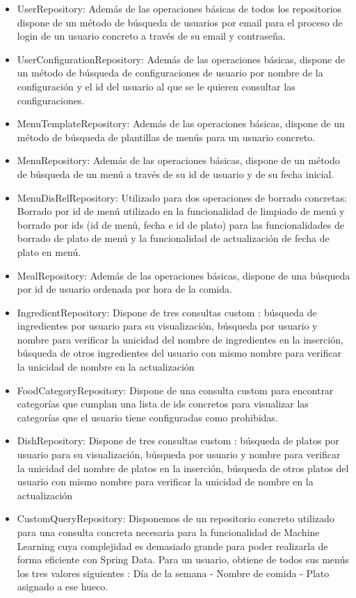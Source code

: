 \documentclass[12pt, a4paper, twoside]{book}
\begin{document}
	\begin{itemize}
		\item UserRepository: Además de las operaciones básicas de todos los repositorios dispone de un método de búsqueda de usuarios por email para el proceso de login de un usuario concreto a través de su email y contraseña.
		\item UserConfigurationRepository: Además de las operaciones básicas, dispone de un método de búsqueda de configuraciones de usuario por nombre de la configuración y el id del usuario al que se le quieren consultar las configuraciones.
		\item MenuTemplateRepository: Además de las operaciones básicas, dispone de un método de búsqueda de plantillas de menús para un usuario concreto.
		\item MenuRepository: Además de las operaciones básicas, dispone de un método de búsqueda de un menú a través de su id de usuario y de su fecha inicial.
		\item MenuDisRelRepository: Utilizado para dos operaciones de borrado concretas: Borrado por id de menú utilizado en la funcionalidad de limpiado de menú y borrado por ids (id de menú, fecha e id de plato) para las funcionalidades de borrado de plato de menú y la funcionalidad de actualización de fecha de plato en menú.
		\item MealRepository: Además de las operaciones básicas, dispone de una búsqueda por id de usuario ordenada por hora de la comida.
		\item IngredientRepository: Dispone de tres consultas custom : búsqueda de ingredientes por usuario para su visualización, búsqueda por usuario y nombre para verificar la unicidad del nombre de ingredientes en la inserción, búsqueda de otros ingredientes del usuario con mismo nombre para verificar la unicidad de nombre en la actualización
		\item FoodCategoryRepository: Dispone de una consulta custom para encontrar categorías que cumplan una lista de ids concretos para visualizar las categorías que el usuario tiene configuradas como prohibidas.
		\item DishRepository: Dispone de tres consultas custom : búsqueda de platos por usuario para su visualización, búsqueda por usuario y nombre para verificar la unicidad del nombre de platos en la inserción, búsqueda de otros platos del usuario con mismo nombre para verificar la unicidad de nombre en la actualización
		\item CustomQueryRepository: Disponemos de un repositorio concreto utilizado para una consulta concreta necesaria para la funcionalidad de Machine Learning cuya complejidad es demasiado grande para poder realizarla de forma eficiente con Spring Data. Para un usuario, obtiene de todos sus menús los tres valores siguientes : Día de la semana - Nombre de comida - Plato asignado a ese hueco. 	
	\end{itemize}
	
\end{document}
